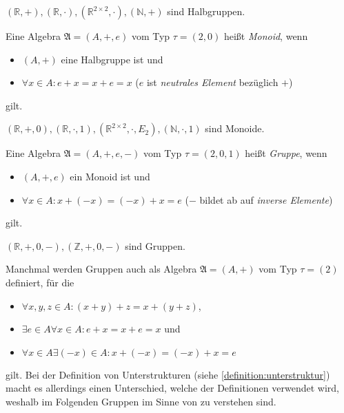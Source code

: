 \begin{example} $(\mathbb{R}, +), (\mathbb{R}, \cdot), (\mathbb{R}^{2\times 2}, \cdot), (\mathbb{N}, +)$ sind Halbgruppen.
\end{example}

\begin{definition}\label{def:monoid}
    Eine Algebra $\mathfrak{A} = (A, +, e)$ vom Typ $\tau = (2,0)$ heißt \emph{Monoid}, wenn
    \begin{itemize}
        \item $(A, +)$ eine Halbgruppe ist und
        \item $\forall x \in A: e + x = x + e = x$ \tab ($e$ ist \emph{neutrales Element} bezüglich $+$)
    \end{itemize}
    gilt.
\end{definition}

\begin{example}
    $(\mathbb{R}, +, 0), (\mathbb{R}, \cdot, 1), (\mathbb{R}^{2\times 2}, \cdot, E_2), (\mathbb{N}, \cdot, 1)$ sind Monoide.
\end{example}

\begin{definition}\label{def:gruppe1}
    Eine Algebra $\mathfrak{A} = (A, +, e, -)$ vom Typ $\tau = (2,0,1)$ heißt \emph{Gruppe}, wenn
    \begin{itemize}
        \item $(A, +, e)$ ein Monoid ist und
        \item $\forall x \in A: x + (-x) = (-x) + x = e$ \tab ($-$ bildet ab auf \emph{inverse Elemente})
    \end{itemize}
    gilt.
\end{definition}

\begin{example}
    $(\mathbb{R},+, 0, -), (\mathbb{Z}, +, 0, -)$ sind Gruppen.
\end{example}

\begin{remark}\label{rem:alternativegruppe}
    Manchmal werden Gruppen auch als Algebra $\mathfrak{A} = (A, +)$ vom Typ $\tau = (2)$ definiert, für die
    \begin{itemize}
        \item $\forall x,y,z \in A: (x + y) + z = x + (y + z)$,
        \item $\exists e \in A \forall x \in A: e + x = x + e = x$ und 
        \item $\forall x \in A \exists (-x) \in A: x + (-x) = (-x) + x = e$
    \end{itemize}
    gilt.
    Bei der Definition von Unterstrukturen (siehe \cref{definition:unterstruktur}) macht es allerdings einen Unterschied, welche der Definitionen verwendet wird, weshalb im Folgenden Gruppen im Sinne von  zu verstehen sind.
\end{remark}

